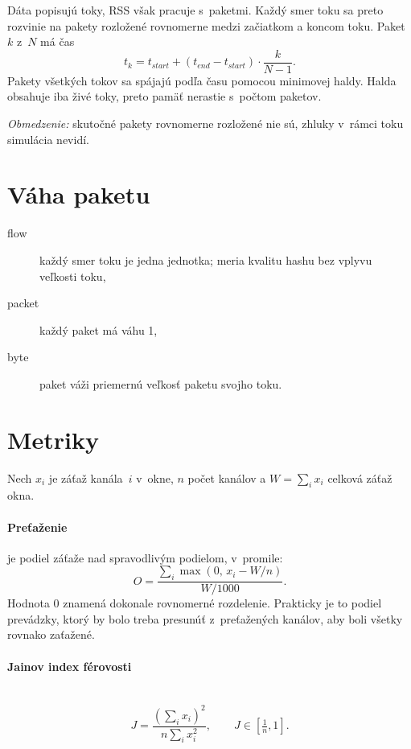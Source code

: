 Dáta popisujú toky, RSS však pracuje s~paketmi. Každý smer toku sa preto rozvinie na pakety
rozložené rovnomerne medzi začiatkom a koncom toku. Paket $k$ z~$N$ má čas
\begin{equation}
  t_k = t_\mathit{start} + (t_\mathit{end} - t_\mathit{start}) \cdot \frac{k}{N-1} .
\end{equation}
Pakety všetkých tokov sa spájajú podľa času pomocou minimovej haldy. Halda obsahuje iba
živé toky, preto pamäť nerastie s~počtom paketov.

\emph{Obmedzenie:} skutočné pakety rovnomerne rozložené nie sú, zhluky v~rámci toku
simulácia nevidí.

\section{Váha paketu}
\label{sec:vahy}

\begin{description}
  \item[flow] každý smer toku je jedna jednotka; meria kvalitu hashu bez vplyvu veľkosti toku,
  \item[packet] každý paket má váhu 1,
  \item[byte] paket váži priemernú veľkosť paketu svojho toku.
\end{description}

\section{Metriky}
\label{sec:metriky}

Nech $x_i$ je záťaž kanála~$i$ v~okne, $n$ počet kanálov a $W=\sum_i x_i$ celková záťaž okna.

\paragraph{Preťaženie} je podiel záťaže nad spravodlivým podielom, v~promile:
\begin{equation}
  O = \frac{\sum_{i} \max\left(0,\, x_i - W/n\right)}{W/1000} .
\end{equation}
Hodnota 0 znamená dokonale rovnomerné rozdelenie. Prakticky je to podiel prevádzky, ktorý by
bolo treba presunúť z~preťažených kanálov, aby boli všetky rovnako zaťažené.

\paragraph{Jainov index férovosti}~
\begin{equation}
  J = \frac{\left(\sum_i x_i\right)^2}{n \sum_i x_i^2} , \qquad J \in \left[\tfrac{1}{n}, 1\right].
\end{equation}

